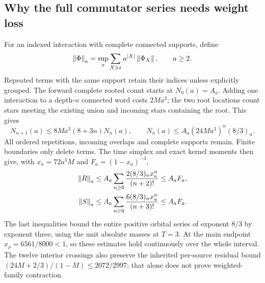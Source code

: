 \subsection{Why the full commutator series needs weight loss}
For an indexed interaction with complete connected supports, define
\begin{equation}
\left\lVert\Phi\right\rVert_a=\sup_x\sum_{X\ni x}a^{|X|}\left\lVert\Phi_X\right\rVert,\qquad a\ge2.
\label{eq:norm}
\end{equation}
Repeated terms with the same support retain their indices unless explicitly grouped. The forward complete rooted count starts at $N_0(a)=A_a$. Adding one interaction to a depth-$n$ connected word costs $2Ma^3$; the two root locations count stars meeting the existing union and incoming stars containing the root. This gives
\begin{equation}
N_{n+1}(a)\le8Ma^3(8+3n)N_n(a),\qquad
N_n(a)\le A_a(24Ma^3)^n(8/3)_n.
\label{eq:agcount}
\end{equation}
All ordered repetitions, incoming overlaps and complete supports remain. Finite boundaries only delete terms. The time simplex and exact kernel moments then give, with $x_a=72a^3M$ and $F_a=(1-x_a)^{-3}$,
\begin{align}
\left\lVert R\right\rVert_a&\le A_a\sum_{n\ge0}\frac{2(8/3)_nx_a^n}{(n+2)!}\le A_aF_a,\nonumber\\
\left\lVert S\right\rVert_a&\le A_a\sum_{n\ge0}\frac{6(8/3)_nx_a^n}{(n+3)!}\le A_aF_a.
\label{eq:agfilterbudget}
\end{align}
The last inequalities bound the entire positive orbital series of exponent $8/3$ by exponent three, using the unit absolute masses at $T=3$. At the main endpoint $x_\rho=6561/8000<1$, so these estimates hold continuously over the whole interval. The twelve interior crossings also preserve the inherited per-source residual bound $(24M+2/3)/(1-M)\le2072/2997$; that alone does not prove weighted-family contraction.

